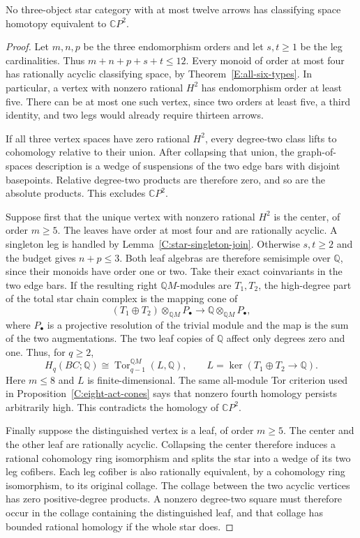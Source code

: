 \begin{lemma}
\label{C:twelve-all-stars}
No three-object star category with at most twelve arrows has
classifying space homotopy equivalent to $\mathbb CP^2$.
\end{lemma}
\begin{proof}
Let $m,n,p$ be the three endomorphism orders and let $s,t\geq1$
be the leg cardinalities. Thus $m+n+p+s+t\leq12$.
Every monoid of order at most four has rationally acyclic
classifying space, by Theorem~\ref{E:all-six-types}.
In particular, a vertex with nonzero rational $H^2$ has
endomorphism order at least five. There can be at most one
such vertex, since two orders at least five, a third identity,
and two legs would already require thirteen arrows.

If all three vertex spaces have zero rational $H^2$, every
degree-two class lifts to cohomology relative to their union.
After collapsing that union, the graph-of-spaces description
is a wedge of suspensions of the two edge bars with disjoint
basepoints. Relative degree-two products are therefore zero,
and so are the absolute products. This excludes $\mathbb CP^2$.

Suppose first that the unique vertex with nonzero rational
$H^2$ is the center, of order $m\geq5$.
The leaves have order at most four and are rationally acyclic.
A singleton leg is handled by
Lemma~\ref{C:star-singleton-join}. Otherwise $s,t\geq2$ and
the budget gives $n+p\leq3$. Both leaf algebras are therefore
semisimple over $\mathbb Q$, since their monoids have order
one or two. Take their exact coinvariants in the two edge
bars. If the resulting right $\mathbb QM$-modules are $T_1,T_2$,
the high-degree part of the total star chain complex is the
mapping cone of
\[
 (T_1\oplus T_2)\otimes_{\mathbb QM}P_\bullet
 \longrightarrow\mathbb Q\otimes_{\mathbb QM}P_\bullet,
\]
where $P_\bullet$ is a projective resolution of the trivial
module and the map is the sum of the two augmentations.
The two leaf copies of $\mathbb Q$ affect only degrees zero
and one. Thus, for $q\geq2$,
\[
 H_q(BC;\mathbb Q)
 \cong\operatorname{Tor}_{q-1}^{\mathbb QM}(L,\mathbb Q),
 \qquad L=\ker(T_1\oplus T_2\to\mathbb Q).
\]
Here $m\leq8$ and $L$ is finite-dimensional. The same
all-module Tor criterion used in
Proposition~\ref{C:eight-act-cones} says that nonzero fourth
homology persists arbitrarily high. This contradicts the
homology of $\mathbb CP^2$.

Finally suppose the distinguished vertex is a leaf, of order
$m\geq5$. The center and the other leaf are rationally acyclic.
Collapsing the center therefore induces a rational cohomology
ring isomorphism and splits the star into a wedge of its two
leg cofibers. Each leg cofiber is also rationally equivalent,
by a cohomology ring isomorphism, to its original collage.
The collage between the two acyclic vertices has zero
positive-degree products. A nonzero degree-two square must
therefore occur in the collage containing the distinguished
leaf, and that collage has bounded rational homology if the
whole star does.


\end{proof}
